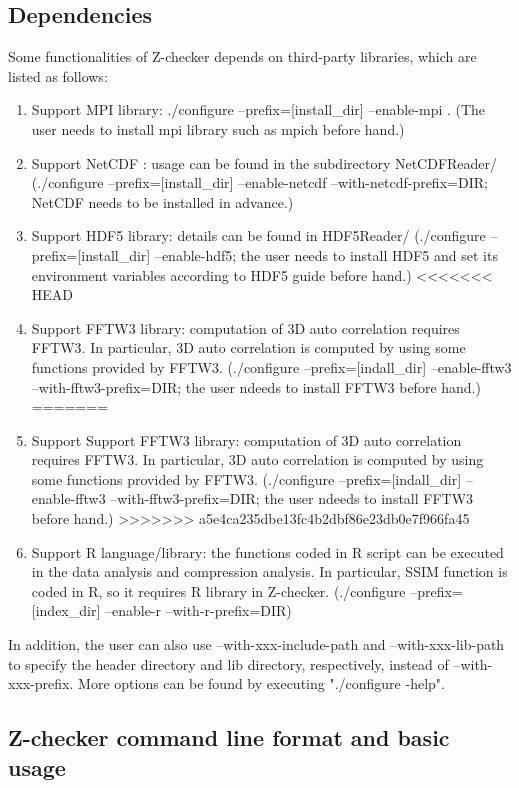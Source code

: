 \subsection{Dependencies}

Some functionalities of Z-checker depends on third-party libraries, which are listed as follows:

\begin{enumerate}
\item Support MPI library: ./configure --prefix=[install\_dir] --enable-mpi . (The user needs to install mpi library such as mpich before hand.)
\item Support NetCDF : usage can be found in the subdirectory NetCDFReader/ (./configure --prefix=[install\_dir] --enable-netcdf --with-netcdf-prefix=DIR; NetCDF needs to be installed in advance.)
\item Support HDF5 library: details can be found in HDF5Reader/ (./configure --prefix=[install\_dir] --enable-hdf5; the user needs to install HDF5 and set its environment variables according to HDF5 guide before hand.)
<<<<<<< HEAD
\item Support FFTW3 library: computation of 3D auto correlation requires FFTW3. In particular, 3D auto correlation is computed by using some functions provided by FFTW3. (./configure --prefix=[indall\_dir] --enable-fftw3 --with-fftw3-prefix=DIR; the user ndeeds to install FFTW3 before hand.)
=======
\item Support Support FFTW3 library: computation of 3D auto correlation requires FFTW3. In particular, 3D auto correlation is computed by using some functions provided by FFTW3. (./configure --prefix=[indall\_dir] --enable-fftw3 --with-fftw3-prefix=DIR; the user ndeeds to install FFTW3 before hand.)
>>>>>>> a5e4ca235dbe13fc4b2dbf86e23db0e7f966fa45
\item Support R language/library: the functions coded in R script can be executed in the data analysis and compression analysis. In particular, SSIM function is coded in R, so it requires R library in Z-checker. (./configure --prefix=[index\_dir] --enable-r --with-r-prefix=DIR)
\end{enumerate}

In addition, the user can also use --with-xxx-include-path and --with-xxx-lib-path to specify the header directory and lib directory, respectively, instead of --with-xxx-prefix. More options can be found by executing "./configure -help".

\subsection{Z-checker command line format and basic usage}

